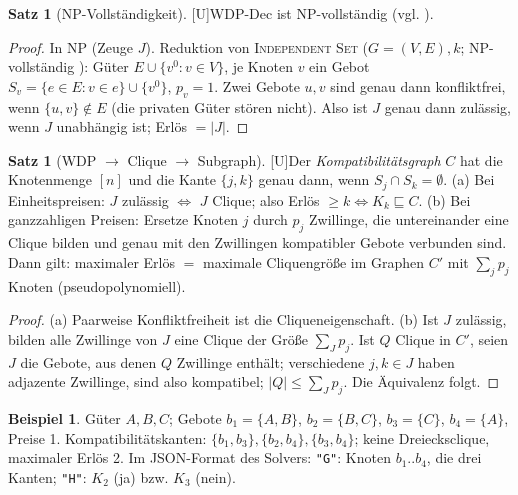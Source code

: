 \documentclass[a4paper,12pt]{article}
\theoremstyle{definition}
\newtheorem{satz}[definition]{Satz}
\newtheorem{beispiel}[definition]{Beispiel}
\newcommand{\tU}{\textsf{\small[U]}}   %
\newcommand{\cNP}{\ensuremath{\mathrm{NP}}}
\begin{document}
\begin{satz}[NP-Vollständigkeit]\tU\label{satz:wdp-np}
WDP-Dec ist \(\cNP\)-vollständig (vgl. \cite{rothkopf1998,sandholm2002}).
\end{satz}
\begin{proof}
In \(\cNP\) (Zeuge \(J\)). Reduktion von \textsc{Independent Set} (\(G=(V,E),k\); \cNP-vollständig \cite{karp}): Güter \(E\cup\{v^0: v\in V\}\), je Knoten \(v\) ein Gebot \(S_v=\{e\in E: v\in e\}\cup\{v^0\}\), \(p_v=1\). Zwei Gebote \(u,v\) sind genau dann konfliktfrei, wenn \(\{u,v\}\notin E\) (die privaten Güter stören nicht). Also ist \(J\) genau dann zulässig, wenn \(J\) unabhängig ist; Erlös \(=|J|\).
\end{proof}

\begin{satz}[WDP \(\to\) Clique \(\to\) Subgraph]\tU\label{satz:wdp-clique}
Der \emph{Kompatibilitätsgraph} \(C\) hat die Knotenmenge \([n]\) und die Kante \(\{j,k\}\) genau dann, wenn \(S_j\cap S_k=\emptyset\). (a) Bei Einheitspreisen: \(J\) zulässig \(\iff\) \(J\) Clique; also Erlös \(\ge k\iff K_k\sqsubseteq C\). (b) Bei ganzzahligen Preisen: Ersetze Knoten \(j\) durch \(p_j\) Zwillinge, die untereinander eine Clique bilden und genau mit den Zwillingen kompatibler Gebote verbunden sind. Dann gilt: maximaler Erlös \(=\) maximale Cliquengröße im Graphen \(C'\) mit \(\sum_jp_j\) Knoten (pseudopolynomiell).
\end{satz}
\begin{proof}
(a) Paarweise Konfliktfreiheit ist die Cliqueneigenschaft. (b) Ist \(J\) zulässig, bilden alle Zwillinge von \(J\) eine Clique der Größe \(\sum_Jp_j\). Ist \(Q\) Clique in \(C'\), seien \(J\) die Gebote, aus denen \(Q\) Zwillinge enthält; verschiedene \(j,k\in J\) haben adjazente Zwillinge, sind also kompatibel; \(|Q|\le\sum_Jp_j\). Die Äquivalenz folgt.
\end{proof}
\begin{beispiel}
Güter \(A,B,C\); Gebote \(b_1=\{A,B\}\), \(b_2=\{B,C\}\), \(b_3=\{C\}\), \(b_4=\{A\}\), Preise 1. Kompatibilitätskanten: \(\{b_1,b_3\},\{b_2,b_4\},\{b_3,b_4\}\); keine Dreiecksclique, maximaler Erlös 2. Im JSON-Format des Solvers: \texttt{"G"}: Knoten \(b_1..b_4\), die drei Kanten; \texttt{"H"}: \(K_2\) (ja) bzw. \(K_3\) (nein).
\end{beispiel}
\end{document}
